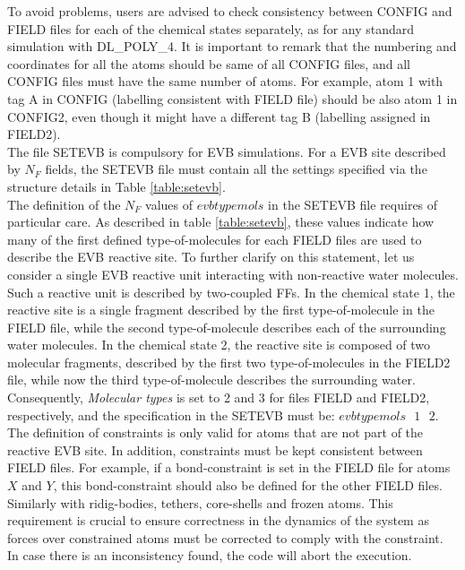 To avoid problems, users are advised to check consistency between CONFIG and FIELD files for each of the chemical states separately, as for any standard simulation with DL\_POLY\_4. It is important to remark that the numbering and coordinates for all the atoms should be same of all CONFIG files, and all CONFIG files must have the same number of atoms. For example, atom 1 with tag A in CONFIG (labelling consistent with FIELD file) should be also atom 1 in CONFIG2, even though it might have a different tag B (labelling assigned in FIELD2).\\
The file SETEVB is compulsory for EVB simulations. For a EVB site described by $N_F$ fields, the SETEVB file must contain all the settings specified via the structure details in Table \ref{table:setevb}.\\
The definition of the $N_F$ values of $evbtypemols$ in the SETEVB file requires of particular care. As described in table \ref{table:setevb}, these values indicate how many of the first defined type-of-molecules for each FIELD files are used to describe the EVB reactive site. To further clarify on this statement, let us consider a single EVB reactive unit interacting with non-reactive water molecules. Such a reactive unit is described by two-coupled FFs. In the chemical state 1, the reactive site is a single fragment described by the first type-of-molecule in the FIELD file, while the second type-of-molecule describes each of the surrounding water molecules. In the chemical state 2, the reactive site is composed of two molecular fragments, described by the first two type-of-molecules in the FIELD2 file, while now the third type-of-molecule describes the surrounding water. Consequently, {\it Molecular types} is set to 2 and 3 for files FIELD and FIELD2, respectively, and the specification in the SETEVB must be: $evbtypemols\,\,\,\,  1\,\,\,\,  2$.\\
The definition of constraints is only valid for atoms that are not part of the reactive EVB site. In addition, constraints must be kept consistent between FIELD files. For example, if a bond-constraint is set in the FIELD file for atoms $X$ and $Y$, this bond-constraint should also be defined for the other FIELD files. Similarly with ridig-bodies, tethers, core-shells and frozen atoms. This requirement is crucial to ensure correctness in the dynamics of the system as forces over constrained atoms must be corrected to comply with the constraint. In case there is an inconsistency found, the code will abort the execution.\\ 
